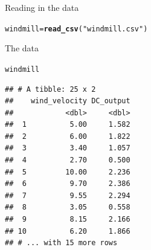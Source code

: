 \documentclass[unknownkeysallowed]{beamer}\usepackage[]{graphicx}\usepackage[]{color}
\makeatletter
\newcommand{\hlstr}[1]{\textcolor[rgb]{0.192,0.494,0.8}{#1}}%
\newcommand{\hlstd}[1]{\textcolor[rgb]{0.345,0.345,0.345}{#1}}%
\newcommand{\hlkwb}[1]{\textcolor[rgb]{0.69,0.353,0.396}{#1}}%
\newcommand{\hlkwd}[1]{\textcolor[rgb]{0.737,0.353,0.396}{\textbf{#1}}}%
\newenvironment{kframe}{%
 \def\at@end@of@kframe{}%
 \ifinner\ifhmode%
  \def\at@end@of@kframe{\end{minipage}}%
  \begin{minipage}{\columnwidth}%
 \fi\fi%
 \def\FrameCommand##1{\hskip\@totalleftmargin \hskip-\fboxsep
 \colorbox{shadecolor}{##1}\hskip-\fboxsep
     \hskip-\linewidth \hskip-\@totalleftmargin \hskip\columnwidth}%
 \MakeFramed {\advance\hsize-\width
   \@totalleftmargin\z@ \linewidth\hsize
   \@setminipage}}%
 {\par\unskip\endMakeFramed%
 \at@end@of@kframe}
\newenvironment{knitrout}{}{} %
\makeatother
\begin{document}
\begin{frame}[fragile]{Reading in the data}

\begin{knitrout}
\color{fgcolor}\begin{kframe}
\begin{alltt}
\hlstd{windmill}\hlkwb{=}\hlkwd{read_csv}\hlstd{(}\hlstr{"windmill.csv"}\hlstd{)}
\end{alltt}


{\ttfamily\noindent\itshape\color{messagecolor}{\#\# Parsed with column specification:\\\#\# cols(\\\#\#\ \  wind\_velocity = col\_double(),\\\#\#\ \  DC\_output = col\_double()\\\#\# )}}\end{kframe}
\end{knitrout}

\end{frame}

\begin{frame}[fragile]{The data}
  
\begin{knitrout}
\color{fgcolor}\begin{kframe}
\begin{alltt}
\hlstd{windmill}
\end{alltt}
\begin{verbatim}
## # A tibble: 25 x 2
##    wind_velocity DC_output
##            <dbl>     <dbl>
##  1          5.00     1.582
##  2          6.00     1.822
##  3          3.40     1.057
##  4          2.70     0.500
##  5         10.00     2.236
##  6          9.70     2.386
##  7          9.55     2.294
##  8          3.05     0.558
##  9          8.15     2.166
## 10          6.20     1.866
## # ... with 15 more rows
\end{verbatim}
\end{kframe}
\end{knitrout}
  
\end{frame}
\end{document}
